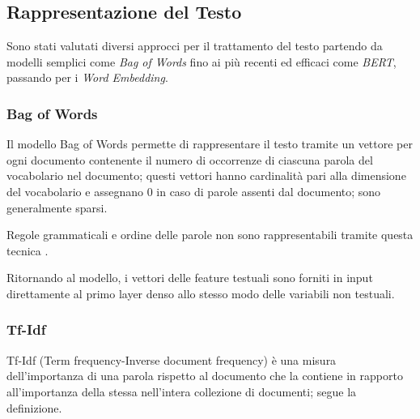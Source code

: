 

\subsection{Rappresentazione del Testo}

Sono stati valutati diversi approcci per il trattamento del testo partendo da
modelli semplici come \textit{Bag of Words} fino ai più recenti ed efficaci come
\textit{BERT}, passando per i \textit{Word Embedding}.

\subsubsection{Bag of Words}
Il modello Bag of Words permette di rappresentare il testo tramite un vettore
per ogni documento contenente il numero di occorrenze di ciascuna parola del
vocabolario nel documento; questi vettori hanno cardinalità pari alla dimensione
del vocabolario e assegnano 0 in caso di parole assenti dal documento; sono
generalmente sparsi.

Regole grammaticali e ordine delle parole non sono rappresentabili
tramite questa tecnica \cite{manning_raghavan_schutze_2008}.

Ritornando al modello, i vettori delle feature testuali sono forniti in input
direttamente al primo layer denso allo stesso modo delle variabili non testuali.

\subsubsection{Tf-Idf}\label{section-tfidf} Tf-Idf (Term frequency-Inverse
document frequency) \cite{manning_raghavan_schutze_2008} è una misura
dell'importanza di una parola rispetto al documento che la contiene in rapporto
all'importanza della stessa nell'intera collezione di documenti; segue la
definizione.%

